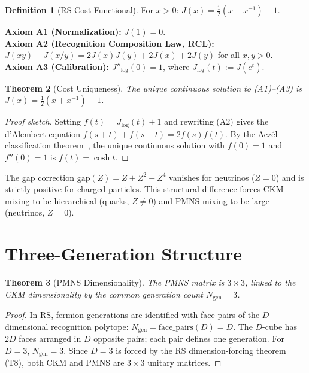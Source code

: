 \documentclass[12pt,a4paper]{article}
\newtheorem{theorem}{Theorem}[section]
\theoremstyle{definition}
\newtheorem{definition}[theorem]{Definition}
\theoremstyle{remark}
\begin{document}
\begin{definition}[RS Cost Functional]
For $x > 0$: $J(x) = \tfrac{1}{2}(x + x^{-1}) - 1$.
\end{definition}

\noindent\textbf{Axiom A1 (Normalization):} $J(1) = 0$.\\
\textbf{Axiom A2 (Recognition Composition Law, RCL):}
$J(xy) + J(x/y) = 2J(x)J(y) + 2J(x) + 2J(y)$ for all $x, y > 0$.\\
\textbf{Axiom A3 (Calibration):} $J''_{\log}(0) = 1$, where
$J_{\log}(t) := J(e^t)$.

\begin{theorem}[Cost Uniqueness]
\label{thm:unique}
The unique continuous solution to \textup{(A1)--(A3)} is
$J(x) = \tfrac{1}{2}(x + x^{-1}) - 1$.
\end{theorem}

\begin{proof}[Proof sketch]
Setting $f(t) = J_{\log}(t) + 1$ and rewriting \textup{(A2)} gives the
d'Alembert equation $f(s+t) + f(s-t) = 2f(s)f(t)$.  By the Acz\'el
classification theorem~\cite{Aczel1966}, the unique continuous solution
with $f(0) = 1$ and $f''(0) = 1$ is $f(t) = \cosh t$.
\end{proof}

\noindent The gap correction $\mathrm{gap}(Z) = Z + Z^2 + Z^4$ vanishes for
neutrinos ($Z = 0$) and is strictly positive for charged particles.
This structural difference forces CKM mixing to be hierarchical (quarks,
$Z \neq 0$) and PMNS mixing to be large (neutrinos, $Z = 0$).

\section{Three-Generation Structure}
\label{sec:structure}

\begin{theorem}[PMNS Dimensionality]
\label{thm:3x3}
The PMNS matrix is $3 \times 3$, linked to the CKM dimensionality
by the common generation count $N_{\mathrm{gen}} = 3$.
\end{theorem}

\begin{proof}
In RS, fermion generations are identified with face-pairs of the
$D$-dimensional recognition polytope:
$N_{\mathrm{gen}} = \mathrm{face\_pairs}(D) = D$.  The $D$-cube has
$2D$ faces arranged in $D$ opposite pairs; each pair defines one
generation.  For $D = 3$, $N_{\mathrm{gen}} = 3$.  Since $D = 3$ is
forced by the RS dimension-forcing theorem (T8), both CKM and PMNS
are $3 \times 3$ unitary matrices.
\end{proof}
\end{document}
